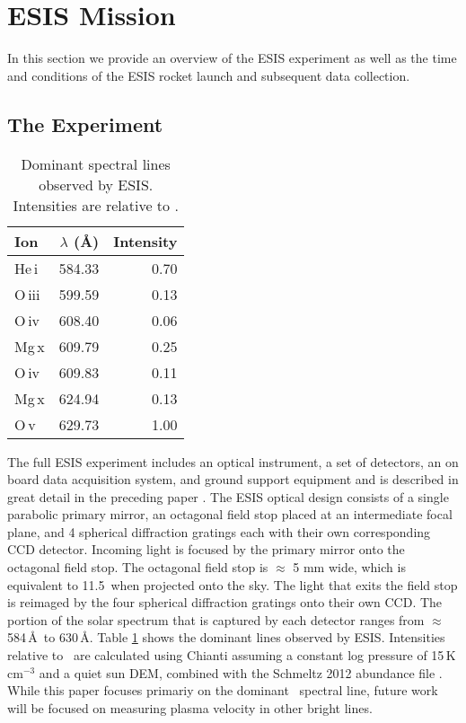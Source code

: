 \section{ESIS Mission}

In this section we provide an overview of the ESIS experiment as well as the time and conditions of the ESIS rocket launch and subsequent data collection.   

	\subsection{The Experiment}
	
	\begin{table}
		\begin{center}
			\caption{Dominant spectral lines observed by ESIS.  Intensities are relative to \ov.}
			\label{tab:linelist}
			\begin{tabular}{l|r|r}
				
				\hline
				Ion & $\lambda$ (\AA) & Intensity \\
				\hline
				He\,{\sc i} & 584.33 & 0.70 \\
				O\,{\sc iii} & 599.59 & 0.13 \\
				O\,{\sc iv} & 608.40 & 0.06 \\
				Mg\,{\sc x} & 609.79 & 0.25 \\
				O\,{\sc iv} & 609.83 & 0.11 \\
				Mg\,{\sc x} & 624.94 & 0.13 \\
				O\,{\sc v} & 629.73 & 1.00 \\

				\hline
			\end{tabular}
		\end{center}
	\end{table}
		
	  	
    	The full ESIS experiment includes an optical instrument, a set of detectors, an on board data acquisition system, and ground support equipment and is described in great detail in the preceding paper \citep{ESIS}.
    	The ESIS optical design consists of a single parabolic primary mirror, an octagonal field stop placed at an intermediate focal plane, and 4 spherical diffraction gratings each with their own corresponding CCD detector.
    	Incoming light is focused by the primary mirror onto the octagonal field stop. 
    	The octagonal field stop is $\approx$ 5 mm wide, which is equivalent to %
    	11.5\arcmin \  when projected onto the sky. 
    	The light that exits the field stop is reimaged  by the four spherical diffraction gratings onto their own CCD.
    	The portion of the solar spectrum that is captured by each detector ranges from $\approx$ 584\,\AA \ to 630\,\AA. 
    	Table \ref{tab:linelist} shows the dominant lines observed by ESIS.
    	Intensities relative to \ov \ are calculated using Chianti \citep{ChiantiI,ChiantiX} assuming a constant log pressure of 15\,K\,cm$^{-3}$ and a quiet sun DEM, combined with the Schmeltz 2012 abundance file \citep{schmelz2012}.
  		While this paper focuses primariy on the dominant \ov \ spectral line, future work will be focused on measuring plasma velocity in other bright lines.
   			
